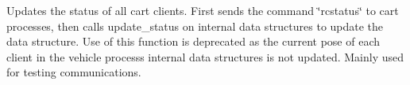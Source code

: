 
\begin{DoxyRefList}
\item[\label{deprecated__deprecated000001}%
\Hypertarget{deprecated__deprecated000001}%
Member \mbox{\hyperlink{classcart__comm_ac3827fcfb77461137bf7a061471c7feb}{cart\+\_\+comm\+:\+:update\+\_\+status}} ()]Updates the status of all cart clients. First sends the command \char`\"{}rcstatus\char`\"{} to cart processes, then calls update\+\_\+status on internal data structures to update the data structure. Use of this function is deprecated as the current pose of each client in the vehicle process\textquotesingle{}s internal data structures is not updated. Mainly used for testing communications. 
\end{DoxyRefList}